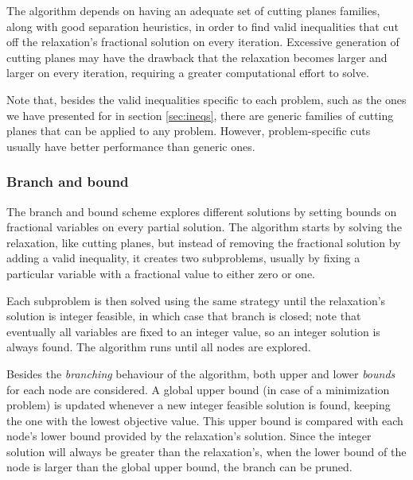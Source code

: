 The algorithm depends on having an adequate set of cutting planes families, along with good separation heuristics, in order to find valid inequalities that cut off the relaxation's fractional solution on every iteration. Excessive generation of cutting planes may have the drawback that the relaxation becomes larger and larger on every iteration, requiring a greater computational effort to solve.

Note that, besides the valid inequalities specific to each problem, such as the ones we have presented for \PCP{} in section \ref{sec:ineqs}, there are generic families of cutting planes that can be applied to any problem. However, problem-specific cuts usually have better performance than generic ones.

\subsubsection{Branch and bound}

The branch and bound scheme explores different solutions by setting bounds on fractional variables on every partial solution. The algorithm starts by solving the relaxation, like cutting planes, but instead of removing the fractional solution by adding a valid inequality, it creates two subproblems, usually by fixing a particular variable with a fractional value to either zero or one. 

Each subproblem is then solved using the same strategy until the relaxation's solution is integer feasible, in which case that branch is closed; note that eventually all variables are fixed to an integer value, so an integer solution is always found. The algorithm runs until all nodes are explored.

Besides the \textit{branching} behaviour of the algorithm, both upper and lower \textit{bounds} for each node are considered. A global upper bound (in case of a minimization problem) is updated whenever a new integer feasible solution is found, keeping the one with the lowest objective value. This upper bound is compared with each node's lower bound provided by the relaxation's solution. Since the integer solution will always be greater than the relaxation's, when the lower bound of the node is larger than the global upper bound, the branch can be pruned.

